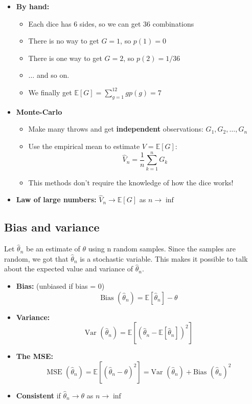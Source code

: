 \begin{itemize}
	\item \textbf{By hand:}
	\begin{itemize}
		\item Each dice has 6 sides, so we can get 36 combinations
		\item There is no way to get $G=1$, so $p(1)=0$
		\item There is one way to get $G=2$, so $p(2) = 1/36$
		\item $\ldots$ and so on. 
		\item We finally get $\mathbb{E}[G] = \sum_{g=1}^{12}gp(g) = 7$ 
	\end{itemize}
	\item \textbf{Monte-Carlo}
	\begin{itemize}
		\item Make many throws and get \textbf{independent} observations: $G_1, G_2, \ldots, G_n$
		\item Use the empirical mean to estimate $V = \mathbb{E}[G]$:
			\begin{equation}
				\hat{V}_n = \frac{1} {n} \sum_{k=1}^{n}G_k
			\end{equation}
		\item This methods don't require the knowledge of how the dice works!
	\end{itemize}
	\item \textbf{Law of large numbers: } $\hat{V}_n \rightarrow \mathbb{E}[G]$ as $n \rightarrow \inf$
\end{itemize}

\subsection*{Bias and variance}
Let $\hat{\theta}_n$ be an estimate of $\theta$ using n random samples. Since the samples are random, we got that $\hat{\theta}_n$ is a stochastic variable. This makes it possible to talk about the expected value and variance of $\hat{\theta}_n$. 

\begin{itemize}
	\item \textbf{Bias: } (unbiased if bias = 0) 
		\begin{equation}
			\text{Bias }(\hat{\theta}_n) = \mathbb{E}[\hat{\theta}_n] - \theta
		\end{equation}
	\item \textbf{Variance: }
		\begin{equation}
			\text{Var }(\hat{\theta}_n) = \mathbb{E}[(\hat{\theta}_n - \mathbb{E}[\hat{\theta}_n])^{2}]
		\end{equation}
	\item \textbf{The MSE: }
		\begin{equation}
			\text{MSE }(\hat{\theta}_n) = \mathbb{E}[(\hat{\theta}_n - \theta)^{2}] = \text{Var }(\hat{\theta}_n) + \text{Bias }(\hat{\theta}_n)^{2}
		\end{equation}
	\item \textbf{Consistent } if $\hat{\theta}_n \rightarrow \theta $ as $n \rightarrow \inf$ 
\end{itemize}

